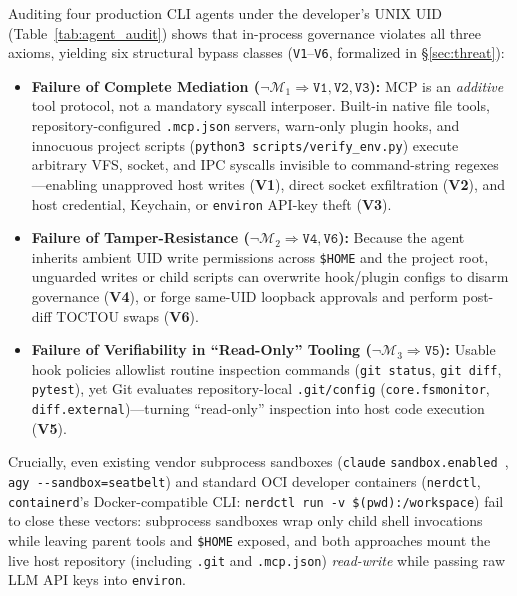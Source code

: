\documentclass[10pt,twocolumn]{article}
\begin{document}
Auditing four production CLI agents under the developer's UNIX UID (Table~\ref{tab:agent_audit}) shows that in-process governance violates all three axioms, yielding six structural bypass classes (\texttt{V1}--\texttt{V6}, formalized in \S\ref{sec:threat}):
\begin{itemize}
    \item \textbf{Failure of Complete Mediation ($\neg\mathcal{M}_1 \Rightarrow \texttt{V1}, \texttt{V2}, \texttt{V3}$):} MCP is an \emph{additive} tool protocol, not a mandatory syscall interposer. Built-in native file tools, repository-configured \texttt{.mcp.json} servers, warn-only plugin hooks, and innocuous project scripts (\texttt{python3 scripts/verify\_env.py}) execute arbitrary VFS, socket, and IPC syscalls invisible to command-string regexes---enabling unapproved host writes (\textbf{V1}), direct socket exfiltration (\textbf{V2}), and host credential, Keychain, or \texttt{environ} API-key theft (\textbf{V3}).
    \item \textbf{Failure of Tamper-Resistance ($\neg\mathcal{M}_2 \Rightarrow \texttt{V4}, \texttt{V6}$):} Because the agent inherits ambient UID write permissions across \texttt{\$HOME} and the project root, unguarded writes or child scripts can overwrite hook/plugin configs to disarm governance (\textbf{V4}), or forge same-UID loopback approvals and perform post-diff TOCTOU swaps (\textbf{V6}).
    \item \textbf{Failure of Verifiability in ``Read-Only'' Tooling ($\neg\mathcal{M}_3 \Rightarrow \texttt{V5}$):} Usable hook policies allowlist routine inspection commands (\texttt{git status}, \texttt{git diff}, \texttt{pytest}), yet Git evaluates repository-local \texttt{.git/config} (\texttt{core.fsmonitor}, \texttt{diff.external})---turning ``read-only'' inspection into host code execution (\textbf{V5}).
\end{itemize}

Crucially, even existing vendor subprocess sandboxes (\texttt{claude} \texttt{sandbox.enabled}~\cite{anthropic2025srt}, \texttt{agy -\/-sandbox=seatbelt}) and standard OCI developer containers (\texttt{nerdctl}, \texttt{containerd}'s Docker-compatible CLI: \texttt{nerdctl run -v \$(pwd):/workspace}) fail to close these vectors: subprocess sandboxes wrap only child shell invocations while leaving parent tools and \texttt{\$HOME} exposed, and both approaches mount the live host repository (including \texttt{.git} and \texttt{.mcp.json}) \emph{read-write} while passing raw LLM API keys into \texttt{environ}.
\end{document}

